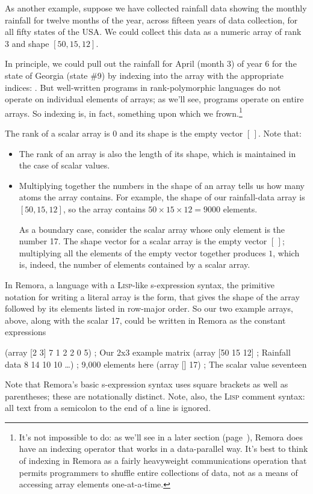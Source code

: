 As another example, suppose we have collected rainfall data showing
the monthly rainfall for twelve months of the year,
across fifteen years of data collection,
for all fifty states of the USA\@.
We could collect this data as a numeric array 
of rank 3 and shape $[50,15,12]$.

In principle, we could pull out the rainfall for April (month 3) of
year 6 for the state of Georgia (state \#9)
by indexing into the array with the appropriate
indices: .
But well-written programs in rank-polymorphic languages do not operate
on individual elements of arrays;
as we'll see, programs operate on entire arrays.
So indexing is, in fact, something upon which we frown.\footnote{
  It's not impossible to do:
  as we'll see in a later section (page~\pageref{sec:indexing}),
  Remora does have an indexing operator that works in a data-parallel way.
  It's best to think of indexing in Remora as a
  fairly heavyweight communications operation that permits programmers
  to shuffle entire collections of data,
  not as a means of accessing array elements one-at-a-time.}

The rank of a scalar array is 0 and its shape is the empty vector $[\,]$.
Note that:
\begin{itemize}
\item The rank of an array is also the length of its shape,
      which is maintained in the case of scalar values.
\item Multiplying together the numbers in the shape of an array
      tells us how many atoms the array contains. For example,
      the shape of our rainfall-data array is $[50,15,12]$, so
      the array contains $50 \times 15 \times 12 = 9000$ elements.

      As a boundary case, consider the scalar array whose only
      element is the number 17. The shape vector for a scalar
      array is the empty vector $[\,]$; multiplying all the elements
      of the empty vector together produces $1$, which is, indeed,
      the number of elements contained by a scalar array.
\end{itemize}

In Remora, a language with a \textsc{Lisp}-like s-expression syntax,
the primitive notation for writing a literal array is the  form,
that gives the shape of the array followed by its elements listed
in row-major order.
So our two example arrays, above, along with the scalar 17,
could be written in Remora as the constant expressions
\begin{code}
(array [2 3] 7 1 2 2 0 5) ; Our 2x3 example matrix
(array [50 15 12]         ; Rainfall data
       8 14 10 10 \ldots)    ;   9,000 elements here
(array [] 17)             ; The scalar value seventeen\end{code}
Note that Remora's basic s-expression syntax uses square brackets
as well as parentheses; these are notationally distinct.
Note, also, the \textsc{Lisp} comment syntax:
all text from a semicolon to the end of a line is ignored.

